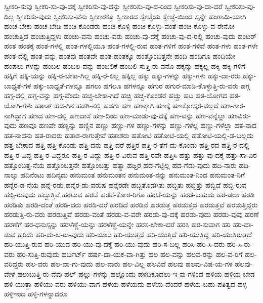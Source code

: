 {ಸ್ವೀಕರಿ-ಸುವು
ಸ್ವೀಕರಿ-ಸು-ವು-ದಕ್ಕೆ
ಸ್ವೀಕರಿಸು-ವು-ದನ್ನು
ಸ್ವೀಕರಿಸು-ವು-ದ-ರಿಂದ
ಸ್ವೀಕರಿಸು-ವು-ದಾ-ದರೆ
ಸ್ವೀಕರಿಸು-ವು-ದಿಲ್ಲ
ಸ್ವೀಕರಿಸು-ವುದು
ಸ್ವೀಕರಿಸು-ವೆನು
ಸ್ವೀಕಾರಕ್ಕೂ
ಸ್ವೀಕಾರದ
ಸ್ವೇಚ್ಛೆಯ
ಸ್ವೇಚ್ಛೆ-ಯಿಂದ
ಸ್ಸನ್ನೇ
ಹಂಗಾಮಿ-ಯಾಗಿ
ಹಂಚ-ಬೇಕು
ಹಂಚ-ಬೇಡಿ
ಹಂಚಿ-ಕೊಂಡರು
ಹಂಚಿ-ಕೊಳ್ಳಿ
ಹಂಚಿ-ಕೊಳ್ಳು-ವಂತೆ
ಹಂಚಿ-ಕೊಳ್ಳು-ವ-ರೇನೋ
ಹಂಚುತ್ತಿದೆ
ಹಂಚುತ್ತಿದ್ದಳು
ಹಂಚು-ವನು
ಹಂಚು-ವರು
ಹಂಚು-ವು-ದಕ್ಕೆ
ಹಂಚು-ವು-ದ-ರಲ್ಲಿ
ಹಂಚು-ವುದು
ಹಂಟರ್
ಹಂತ
ಹಂತಕ್ಕೆ
ಹಂತ-ಗಳಲ್ಲಿ
ಹಂತ-ಗಳಲ್ಲಿಯೂ
ಹಂತ-ಗಳಲ್ಲಿ-ರುವ
ಹಂತ-ಗಳಿಗೆ
ಹಂತ-ಗಳಿವೆ
ಹಂತ-ಗಳು
ಹಂತ-ಗಳೇ
ಹಂತ-ದಲ್ಲಿ
ಹಂತ-ವನ್ನು
ಹಂತವು
ಹಂತವೇ
ಹಂತ-ಹಂತಕ್ಕೂ
ಹಂತ್ತೊಂಬತ್ತನೇ
ಹಂದಿ
ಹಂದಿಗೂ
ಹಂದಿಯೇ
ಹಂಪಲು-ಗಳನ್ನು
ಹಂಬಲ
ಹಂಬಲ-ವನ್ನು
ಹಂಬಲಿಕೆ
ಹಂಬಲಿ-ಸುತ್ತಿ-ರು-ವನೊ
ಹಕ್ಕನ್ನು
ಹಕ್ಕಲ್ಲ
ಹಕ್ಕಿ
ಹಕ್ಕಿ-ಗಳಿಗೆ
ಹಕ್ಕಿಗೆ
ಹಕ್ಕಿ-ಯನ್ನು
ಹಕ್ಕಿ-ರ-ಬೇಕಾ-ಗಿಲ್ಲ
ಹಕ್ಕಿ-ರ-ಲಿಲ್ಲ
ಹಕ್ಕಿಲ್ಲ
ಹಕ್ಕು
ಹಕ್ಕು-ಗಳನ್ನು
ಹಕ್ಕು-ಗಳು
ಹಕ್ಕು-ದಾ-ರರು
ಹಕ್ಕು-ಬಾಧ್ಯತೆ-ಗಳ
ಹಕ್ಕು-ಬಾಧ್ಯತೆ-ಗಳನ್ನೂ
ಹಗಲು
ಹಗಲೂ
ಹಗಳನ್ನೂ
ಹಗುರ
ಹಗುರ-ಮಾಡಿ-ಕೊಳ್ಳುತ್ತಿ-ರು-ವರು
ಹಗ್ಗ
ಹಗ್ಗ-ದಲ್ಲಿ
ಹಗ್ಗ-ವನ್ನು
ಹಗ್ಗ-ವೆಂದು
ಹಚ್ಚ-ಬೇಕಾ-ಗಿದೆ
ಹಚ್ಚಿ
ಹಚ್ಚಿ-ಕೊಂಡರೆ
ಹಚ್ಚು
ಹಟ
ಹಠ-ಯೋಗದ
ಹಠ-ಯೋಗಿ-ಗಳು
ಹಠಾತ್
ಹಡ-ಗಿನ
ಹಡಗಿ-ನಲ್ಲಿ
ಹಡಗು
ಹಣ
ಹಣಕ್ಕಾಗಿ
ಹಣಕ್ಕೆ
ಹಣಕ್ಕೋಸ್ಕರ-ವಲ್ಲದೆ
ಹಣ-ಗಾರ-ನಾಗಿದ್ದಾಗ
ಹಣದ
ಹಣ-ದಲ್ಲಿ
ಹಣದಾಸೆ
ಹಣ-ದಿಂದ
ಹಣ-ಮಾಡು-ವು-ದಕ್ಕೆ
ಹಣ-ವನ್ನು
ಹಣ-ವನ್ನೆಲ್ಲಾ
ಹಣವಿರು-ವುದು
ಹಣವೂ
ಹಣವೇ
ಹಣ್ಣನ್ನು
ಹಣ್ಣಿನ
ಹಣ್ಣು
ಹಣ್ಣು-ಗಳ
ಹಣ್ಣು-ಗಳನ್ನು
ಹಣ್ಣು-ಗಳೆಲ್ಲ
ಹಣ್ಣು-ಗಳೆಲ್ಲಾ
ಹತ-ನಾದ
ಹತ-ನಾದನು
ಹತ-ರಾದರು
ಹತಾಶ-ರಾಗುತ್ತೇವೆ
ಹತಾಶರು
ಹತೋಟಿ
ಹತೋಟಿ-ಯಲ್ಲಿ
ಹತೋಟಿ-ಯಲ್ಲಿ-ಡ-ಬಲ್ಲದು
ಹತ್ತ-ಬೇಕಾದ
ಹತ್ತಿ
ಹತ್ತಿ-ಕೊಂಡು
ಹತ್ತಿ-ದನು
ಹತ್ತಿ-ದರೆ
ಹತ್ತಿರ
ಹತ್ತಿ-ರ-ತೆಗೆ-ದು-ಕೊಂಡು
ಹತ್ತಿ-ರದ
ಹತ್ತಿ-ರ-ದಲ್ಲಿ
ಹತ್ತಿ-ರ-ವಿದ್ದ
ಹತ್ತಿ-ರ-ವಿದ್ದರೂ
ಹತ್ತಿ-ರ-ವಿದ್ದು
ಹತ್ತಿ-ರ-ವಿರುವ
ಹತ್ತಿ-ರವೇ
ಹತ್ತಿಸಿ
ಹತ್ತು
ಹತ್ತು-ವು-ದಕ್ಕೆ
ಹತ್ತು-ಸಾ-ವಿರ
ಹತ್ತೊಂಬತ್ತ-ನೆಯ
ಹತ್ತೊಂಬತ್ತನೇ
ಹತ್ತೊಂಬತ್ತು
ಹತ್ಯಾ
ಹಥ್ತಿರ
ಹದ-ಗೆಟ್ಟಿಲ್ಲ
ಹದ-ಗೆಡು-ವುದು
ಹದಿ-ನಾರು
ಹದಿ-ನಾಲ್ಕು
ಹದಿನೆಂಟು
ಹದಿನೈದು
ಹನುಮಂತ
ಹನುಮಂತನ
ಹನುಮಂತ-ನನ್ನು
ಹನುಮಂತ-ನಿಂದ
ಹನುಮಂತ-ನಿಗೆ
ಹನ್ನೆರ-ಡ-ನೆಯ
ಹನ್ನೆ-ರಡು
ಹನ್ನೆರ-ಡು-ವರುಷ
ಹನ್ನೆರಡೇ
ಹಬ್ಬತೊಡಗಿತು
ಹಬ್ಬಿತು
ಹಬ್ಬಿತ್ತು
ಹಬ್ಬಿದೆ
ಹಬ್ಬಿ-ರುವ
ಹಬ್ಬಿ-ರುವುದು
ಹಬ್ಬುತ್ತಿವೆ
ಹರಟುವ
ಹರಟೆ
ಹರಟೆ-ಕೋರ-ರಿಗೂ
ಹರಟೆ-ಯನ್ನು
ಹರಡ-ಬಹುದು
ಹರ-ಡಲು
ಹರಡಿ
ಹರಡಿತು
ಹರಡಿ-ದಂತೆ
ಹರಡಿ-ದರು
ಹರಡಿ-ದರೆ
ಹರಡಿದೆ
ಹರಡಿವೆ
ಹರಡುತ್ತ
ಹರಡುತ್ತದೆ
ಹರಡುತ್ತವೆ
ಹರಡುತ್ತಿದ್ದರು
ಹರಡುತ್ತಿ-ರು-ವರು
ಹರಡುತ್ತಿವೆ
ಹರಡು-ವಂತೆ
ಹರಡು-ವ-ವರೇ
ಹರಡು-ವು-ದಕ್ಕೆ
ಹರಡು-ವುದು
ಹರಡು-ವುವು
ಹರಣೆ
ಹರಣೆಗೆ
ಹರ-ಧನುಸ್ಸನ್ನು
ಹರಳೆಣ್ಣೆ-ಯನ್ನು
ಹರಳೆಣ್ಣೆ-ಯನ್ನೇ
ಹರಸ-ಬೇಕಾ-ದರೆ
ಹರಸಿ
ಹರ-ಸುವಾಗ
ಹರಿ
ಹರಿ-ದಾ-ಡುವ
ಹರಿದು
ಹರಿ-ದು-ಬ-ರು-ವುದು
ಹರಿ-ಯಲು
ಹರಿ-ಯುತ್ತದೆ
ಹರಿ-ಯುತ್ತಿದೆ
ಹರಿ-ಯುತ್ತಿದ್ದ
ಹರಿ-ಯುತ್ತಿರುತ್ತದೆ
ಹರಿ-ಯುತ್ತಿ-ರುವ
ಹರಿ-ಯುವ
ಹರಿ-ಯು-ವು-ದಕ್ಕೆ
ಹರಿ-ಯು-ವುದು
ಹರಿ-ಸ-ಬಲ್ಲ
ಹರಿಸಿ
ಹರಿ-ಸಿ-ದರು
ಹರಿ-ಸಿ-ರು-ವರು
ಹರಿ-ಸುತ್ತಿ-ರುವುದು
ಹರ್ಬರ್ಟ್
ಹರ್ಷ-ದಾ-ಯಕ-ವಾ-ಗಿತ್ತು
ಹಲ
ಹಲ-ವನ್ನು
ಹಲವ-ರನ್ನು
ಹಲ-ವ-ರಿಗೆ
ಹಲ-ವರಿದ್ದರು
ಹಲ-ವರು
ಹಲ-ವಾ-ಗು-ವುದು
ಹಲ-ವಾರು
ಹಲ-ವಿಲ್ಲ
ಹಲವಿವೆ
ಹಲವು
ಹಲವು-ವಿಷ-ಯ-ಗಳ
ಹಲವು-ವೇಳೆ
ಹಲುಬುತ್ತಿ-ರು-ವೆವು
ಹಲ್
ಹಲ್ಲು-ಗಳನ್ನು
ಹಲ್ಲೊಂದು
ಹಳದಿಕೂದಲು-ಇ-ವು-ಗಳಿಂದ
ಹಳಿಯ
ಹಳಿಯ-ಬೇಡ
ಹಳಿ-ಯುತ್ತಾ
ಹಳಿಯು-ವರು
ಹಳಿಯು-ವಾಗ
ಹಳೆಯ
ಹಳೆಯದು
ಹಳೆಯ-ದೆಂದರೆ
ಹಳೆಯ-ಬಹು-ಪತಿತ್ವದ
ಹಳ್ಳ
ಹಳ್ಳಿಇಂದ
ಹಳ್ಳಿ-ಗಳನ್ನಾದರೂ
}
